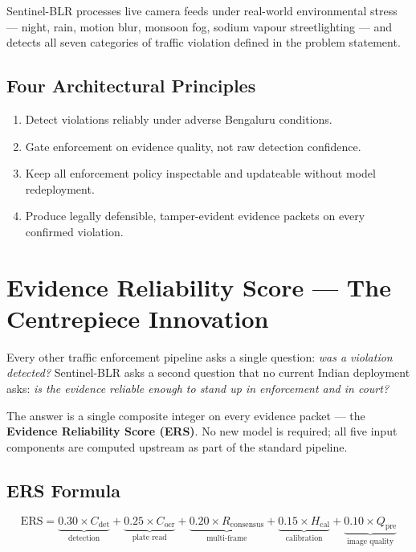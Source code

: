 \documentclass[11pt,a4paper]{article}
\begin{document}
Sentinel-BLR processes live camera feeds under real-world environmental stress --- night, rain, motion blur, monsoon fog, sodium vapour streetlighting --- and detects all seven categories of traffic violation defined in the problem statement.

\subsection*{Four Architectural Principles}
\begin{enumerate}[leftmargin=1.8em, itemsep=0.2em]
    \item Detect violations reliably under adverse Bengaluru conditions.
    \item Gate enforcement on evidence quality, not raw detection confidence.
    \item Keep all enforcement policy inspectable and updateable without model redeployment.
    \item Produce legally defensible, tamper-evident evidence packets on every confirmed violation.
\end{enumerate}

\section{Evidence Reliability Score — The Centrepiece Innovation}
\label{sec:ers}

Every other traffic enforcement pipeline asks a single question: \textit{was a violation detected?} Sentinel-BLR asks a second question that no current Indian deployment asks: \textit{is the evidence reliable enough to stand up in enforcement and in court?}

The answer is a single composite integer on every evidence packet --- the \textbf{Evidence Reliability Score (ERS)}. No new model is required; all five input components are computed upstream as part of the standard pipeline.

\subsection*{ERS Formula}

\begin{equation}
\text{ERS} = \underbrace{0.30 \times C_{\text{det}}}_{\text{detection}} + \underbrace{0.25 \times C_{\text{ocr}}}_{\text{plate read}} + \underbrace{0.20 \times R_{\text{consensus}}}_{\text{multi-frame}} + \underbrace{0.15 \times H_{\text{cal}}}_{\text{calibration}} + \underbrace{0.10 \times Q_{\text{pre}}}_{\text{image quality}}
\end{equation}
\end{document}
